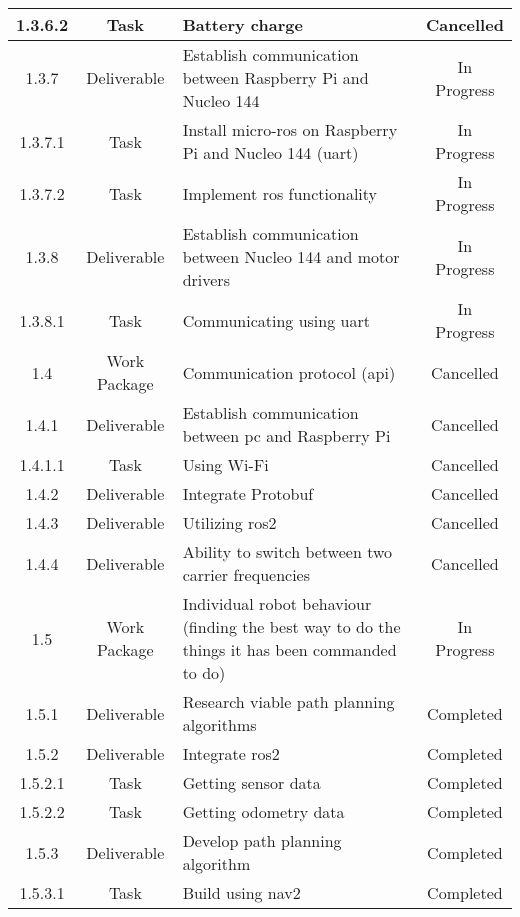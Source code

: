 \begin{longtable}{|c|c|m{}|c|}
    \rowcolor{c} 1.3.6.2 & Task & Battery charge & Cancelled \\ \hline
    \rowcolor{p} 1.3.7 & Deliverable & Establish communication between Raspberry Pi and Nucleo 144 & In Progress \\ \hline
    \rowcolor{p} 1.3.7.1 & Task & Install micro-\acs{ros} on Raspberry Pi and Nucleo 144 (\acs{uart}) & In Progress \\ \hline
    \rowcolor{p} 1.3.7.2 & Task & Implement \acs{ros} functionality & In Progress \\ \hline
    \rowcolor{p} 1.3.8 & Deliverable & Establish communication between Nucleo 144 and motor drivers & In Progress \\ \hline
    \rowcolor{p} 1.3.8.1 & Task & Communicating using \acs{uart} & In Progress \\ \hline
    \rowcolor{c} 1.4 & Work Package & Communication protocol (\acs{api}) & Cancelled \\ \hline
    \rowcolor{c} 1.4.1 & Deliverable & Establish communication between \acs{pc} and Raspberry Pi & Cancelled \\ \hline
    \rowcolor{c} 1.4.1.1 & Task & Using Wi-Fi & Cancelled \\ \hline
    \rowcolor{c} 1.4.2 & Deliverable & Integrate Protobuf & Cancelled \\ \hline
    \rowcolor{c} 1.4.3 & Deliverable & Utilizing \acs{ros2} & Cancelled \\ \hline
    \rowcolor{c} 1.4.4 & Deliverable & Ability to switch between two carrier frequencies & Cancelled \\ \hline
    \rowcolor{p} 1.5 & Work Package & Individual robot behaviour (finding the best way to do the things it has been commanded to do) & In Progress \\ \hline
    \rowcolor{d} 1.5.1 & Deliverable & Research viable path planning algorithms & Completed \\ \hline
    \rowcolor{d} 1.5.2 & Deliverable & Integrate \acs{ros2} & Completed \\ \hline
    \rowcolor{d} 1.5.2.1 & Task & Getting sensor data & Completed \\ \hline
    \rowcolor{d} 1.5.2.2 & Task & Getting odometry data & Completed \\ \hline
    \rowcolor{d} 1.5.3 & Deliverable & Develop path planning algorithm & Completed \\ \hline
    \rowcolor{d} 1.5.3.1 & Task & Build using nav2 & Completed \\ \hline

\end{longtable}
